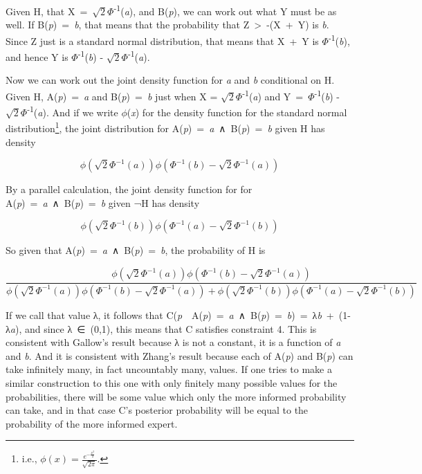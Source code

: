 \documentclass[
  10pt,
  letterpaper,
  DIV=11,
  numbers=noendperiod,
  twoside]{scrartcl}
\begin{document}
Given H, that X~=~\(\sqrt{2}\Phi\)\textsuperscript{-1}(\emph{a}), and
B(\emph{p}), we can work out what Y must be as well. If
B(\emph{p})~=~\emph{b}, that means that the probability that
Z~\textgreater~-(X~+~Y) is \emph{b}. Since Z just is a standard normal
distribution, that means that X~+~Y is
\(\Phi\)\textsuperscript{-1}(\emph{b}), and hence Y is
\(\Phi\)\textsuperscript{-1}(\emph{b}) -
\(\sqrt{2}\Phi\)\textsuperscript{-1}(\emph{a}).

Now we can work out the joint density function for \emph{a} and \emph{b}
conditional on H. Given H, A(\emph{p})~=~\emph{a} and
B(\emph{p})~=~\emph{b} just when X =
\(\sqrt{2}\Phi\)\textsuperscript{-1}(\emph{a}) and
Y~=~\(\Phi\)\textsuperscript{-1}(\emph{b}) -
\(\sqrt{2}\Phi\)\textsuperscript{-1}(\emph{a}). And if we write
\(\phi\)(\emph{x}) for the density function for the standard normal
distribution\footnote{i.e.,
  \(\phi(x) = \frac{e^{-\frac{x^2}{2}}}{\sqrt{2\pi}}\).}, the joint
distribution for A(\emph{p})~=~\emph{a}~∧~B(\emph{p})~=~\emph{b} given H
has density

\[
\phi(\sqrt{2}\Phi^{-1}(a)) \phi(\Phi^{-1}(b) - \sqrt{2}\Phi^{-1}(a))
\]

By a parallel calculation, the joint density function for for
A(\emph{p})~=~\emph{a}~∧~B(\emph{p})~=~\emph{b} given ¬H has density

\[
\phi(\sqrt{2}\Phi^{-1}(b)) \phi(\Phi^{-1}(a) - \sqrt{2}\Phi^{-1}(b))
\]

So given that A(\emph{p})~=~\emph{a}~∧~B(\emph{p})~=~\emph{b}, the
probability of H is

\[
\frac{
\phi(\sqrt{2}\Phi^{-1}(a)) \phi(\Phi^{-1}(b) - \sqrt{2}\Phi^{-1}(a))
}{
\phi(\sqrt{2}\Phi^{-1}(a)) \phi(\Phi^{-1}(b) - \sqrt{2}\Phi^{-1}(a)) + \phi(\sqrt{2}\Phi^{-1}(b)) \phi(\Phi^{-1}(a) - \sqrt{2}\Phi^{-1}(b))
}
\]

If we call that value λ, it follows that
C(\emph{p}~\textbar~A(\emph{p})~=~\emph{a}~∧~B(\emph{p})~=~\emph{b})~=~λ\emph{b}~+~(1-λ\emph{a}),
and since λ~∈~(0,1), this means that C satisfies constraint 4. This is
consistent with Gallow's result because λ is not a constant, it is a
function of \emph{a} and \emph{b}. And it is consistent with Zhang's
result because each of A(\emph{p}) and B(\emph{p}) can take infinitely
many, in fact uncountably many, values. If one tries to make a similar
construction to this one with only finitely many possible values for the
probabilities, there will be some value which only the more informed
probability can take, and in that case C's posterior probability will be
equal to the probability of the more informed expert.
\end{document}
